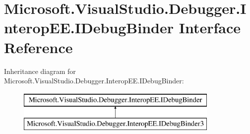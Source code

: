 \hypertarget{interface_microsoft_1_1_visual_studio_1_1_debugger_1_1_interop_e_e_1_1_i_debug_binder}{\section{Microsoft.\+Visual\+Studio.\+Debugger.\+Interop\+E\+E.\+I\+Debug\+Binder Interface Reference}
\label{interface_microsoft_1_1_visual_studio_1_1_debugger_1_1_interop_e_e_1_1_i_debug_binder}
}
Inheritance diagram for Microsoft.\+Visual\+Studio.\+Debugger.\+Interop\+E\+E.\+I\+Debug\+Binder\+:\begin{figure}[H]
\begin{center}
\leavevmode
\includegraphics[height=2.000000cm]{interface_microsoft_1_1_visual_studio_1_1_debugger_1_1_interop_e_e_1_1_i_debug_binder}
\end{center}
\end{figure}
